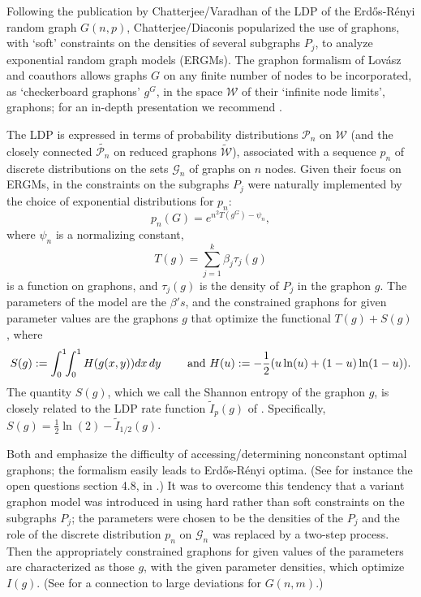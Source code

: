 \documentclass[12pt]{amsart}
\newcommand{\tdens}{\tau}
\newcommand{\1}{\mathbf{1}}
\newcommand{\calG}{\mathcal{G}}
\newcommand{\calP}{\mathcal{P}}
\newcommand{\www}{{\mathcal W}}
\begin{document}
Following the publication by
Chatterjee/Varadhan \cite{CV} of the LDP of the Erd\H{o}s-R\'enyi
random graph $G(n,p)$, Chatterjee/Diaconis popularized \cite{CD} the
use of graphons, with `soft' constraints on the densities of several
subgraphs $P_j$, to analyze  exponential
random graph models (ERGMs).
The graphon formalism of Lov\'asz and coauthors
\cite{BCL,BCLSV,LS1,LS2,LS3} allows graphs $G$ on any finite number of
nodes to be incorporated, as `checkerboard graphons' $g^G$, in the
space $\www$ of their `infinite node limits', graphons; for an
in-depth presentation we recommend \cite{Lov}.

The LDP is
expressed in terms of probability distributions $\calP_n$ on $\www$ (and
the closely connected $\widetilde {\calP_n}$ on reduced graphons
$\widetilde \www$), associated with a sequence $p_n$ of discrete
distributions on the sets $\calG_n$ of graphs on $n$ nodes.
Given their focus on ERGMs, in \cite{CD} the constraints on the
subgraphs $P_j$ were naturally implemented by the choice of exponential
distributions for $p_n$:
\begin{equation}\label{eq:distribution on finite graphs}
  p_n(G)=e^{n^2 T({g^G})-\psi_n},
\end{equation}
where $\psi_n$ is a normalizing constant,
\begin{equation}T(g)=\sum_{j=1}^k \beta_j \tdens_j(g)
\end{equation}
is a function on graphons, 
and $\tdens_j(g)$ is the density of $P_j$ in the graphon $g$.  The
parameters of the model are the $\beta's$, and the constrained
graphons for given parameter values are the graphons $g$ that
optimize the functional $T(g)+S(g)$, where 
\begin{equation}
S(g) := \int_0^1\!\!\int_0^1 H(g(x,y)) dx \, dy \qquad \hbox{ and } H(u) := -\frac12
(u \ln(u) + (1-u)\ln(1-u)).\end{equation}
The quantity $S(g)$, which we call the Shannon entropy of the graphon $g$, is
closely related to the LDP rate function $\tilde I_p(g)$ of \cite{CD}.
Specifically, $S(g) = \frac12 \ln(2) - \tilde I_{1/2}(g)$.


Both \cite{CV} and \cite{CD} emphasize the difficulty of
accessing/determining nonconstant optimal graphons; the formalism 
easily leads to Erd\H{o}s-R\'enyi optima. (See for instance the open
questions section 4.8, in \cite{CV}.) It was to overcome this
tendency that a variant graphon model was introduced in \cite{RS1,RS2}
using hard rather than soft constraints on the subgraphs $P_j$; the
parameters were chosen to be the densities of the $P_j$
and the role of the discrete distribution $p_n$ on $\calG_n$ was
replaced by a two-step process. Then the appropriately
constrained graphons for given values of the parameters are
characterized as those $g$, with the given parameter densities, which
optimize $I(g)$. (See \cite{DL} for a connection to large
deviations for $G(n,m)$.)
\end{document}
